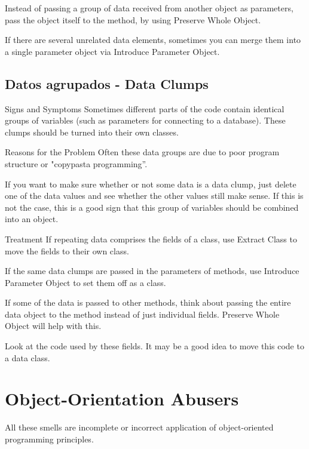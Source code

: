 \documentclass[11pt,a4paper,oneside]{book}
\begin{document}
Instead of passing a group of data received from another object as parameters, pass the object itself to the method, by using Preserve Whole Object.

If there are several unrelated data elements, sometimes you can merge them into a single parameter object via Introduce Parameter Object.

\subsection{Datos agrupados -   Data Clumps}
\label{dataclumps}

    Signs and Symptoms
Sometimes different parts of the code contain identical groups of variables (such as parameters for connecting to a database). These clumps should be turned into their own classes.


Reasons for the Problem
Often these data groups are due to poor program structure or "copypasta programming”.

If you want to make sure whether or not some data is a data clump, just delete one of the data values and see whether the other values still make sense. If this is not the case, this is a good sign that this group of variables should be combined into an object.

Treatment
If repeating data comprises the fields of a class, use Extract Class to move the fields to their own class.

If the same data clumps are passed in the parameters of methods, use Introduce Parameter Object to set them off as a class.

If some of the data is passed to other methods, think about passing the entire data object to the method instead of just individual fields. Preserve Whole Object will help with this.

Look at the code used by these fields. It may be a good idea to move this code to a data class.
    
    
    



\section{Object-Orientation Abusers} 
\label{Object-OrientationAbusers}
All these smells are incomplete or incorrect application of object-oriented programming principles.
    \newline
    
\end{document}
